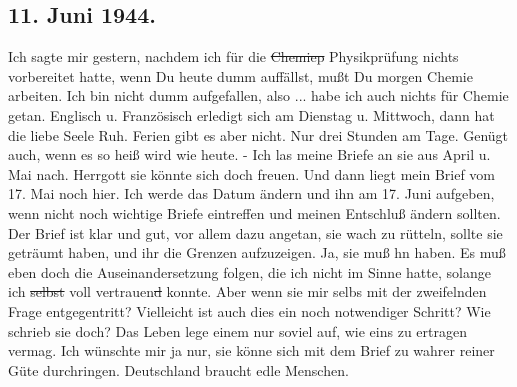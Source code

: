 \subsection{11. Juni 1944.}

Ich sagte mir gestern, nachdem ich f\"{u}r die \st{Chemiep} Physikpr\"{u}fung nichts vorbereitet hatte, wenn Du heute dumm auff\"{a}llst, mu{\ss}t Du morgen Chemie arbeiten.
Ich bin nicht dumm aufgefallen, also ... habe ich auch nichts f\"{u}r Chemie getan.
Englisch u. Franz\"{o}sisch erledigt sich am Dienstag u. Mittwoch, dann hat die liebe Seele Ruh.
Ferien gibt es aber nicht.
Nur drei Stunden am Tage.
Gen\"{u}gt auch, wenn es so hei{\ss} wird wie heute.
- Ich las meine Briefe an sie aus April u. Mai nach.
Herrgott sie k\"{o}nnte sich doch freuen.
Und dann liegt mein Brief vom 17. Mai noch hier.
Ich werde das Datum \"{a}ndern und ihn am 17. Juni aufgeben, wenn nicht noch wichtige Briefe eintreffen und meinen Entschlu{\ss} \"{a}ndern sollten.
Der Brief ist klar und gut, vor allem dazu angetan, sie wach zu r\"{u}tteln, sollte sie getr\"{a}umt haben, und ihr die Grenzen aufzuzeigen.
Ja, sie mu{\ss} hn haben.
Es mu{\ss} eben doch die Auseinandersetzung folgen, die ich nicht im Sinne hatte, solange ich \st{selbst} voll vertrauen\st{d} konnte.
Aber wenn sie mir selbs mit der zweifelnden Frage entgegentritt?
Vielleicht ist auch dies ein noch notwendiger Schritt?
Wie schrieb sie doch?
Das Leben lege einem nur soviel auf, wie eins zu ertragen vermag.
Ich w\"{u}nschte mir ja nur, sie k\"{o}nne sich mit dem Brief zu wahrer reiner G\"{u}te durchringen.
Deutschland braucht edle Menschen.

\clearpage
